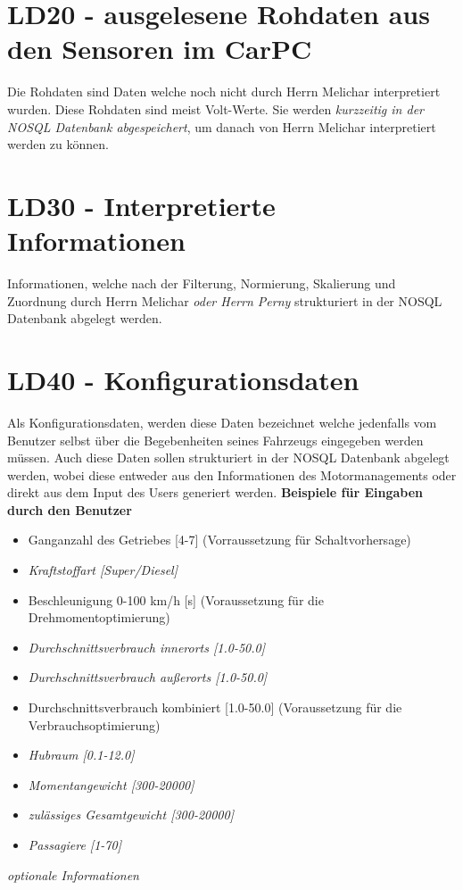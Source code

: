 \section{LD20 - ausgelesene Rohdaten aus den Sensoren im CarPC}
Die Rohdaten sind Daten welche noch nicht durch Herrn Melichar interpretiert wurden. Diese Rohdaten sind meist Volt-Werte. Sie werden \textit{kurzzeitig in der NOSQL Datenbank abgespeichert}, um danach von Herrn Melichar interpretiert werden zu können.

\section{LD30 - Interpretierte Informationen}
Informationen, welche nach der Filterung, Normierung, Skalierung und Zuordnung durch Herrn Melichar \textit{oder Herrn Perny} strukturiert in der NOSQL Datenbank abgelegt werden.

\section{LD40 - Konfigurationsdaten}
Als Konfigurationsdaten, werden diese Daten bezeichnet welche jedenfalls vom Benutzer selbst über die Begebenheiten seines Fahrzeugs eingegeben werden müssen. Auch diese Daten sollen strukturiert in der NOSQL Datenbank abgelegt werden, wobei diese entweder aus den Informationen des Motormanagements oder direkt aus dem Input des Users generiert werden.
\textbf{Beispiele für Eingaben durch den Benutzer}
\begin{itemize}
	\item Ganganzahl des Getriebes [4-7] (Vorraussetzung für Schaltvorhersage)
	\item \textit{Kraftstoffart [Super/Diesel]}
	\item Beschleunigung 0-100 km/h [s] (Voraussetzung für die Drehmomentoptimierung)
	\item \textit{Durchschnittsverbrauch innerorts [1.0-50.0]} 
	\item \textit{Durchschnittsverbrauch außerorts [1.0-50.0]}	
	\item Durchschnittsverbrauch kombiniert [1.0-50.0] (Voraussetzung für die Verbrauchsoptimierung)
	\item \textit{Hubraum [0.1-12.0]}
	\item \textit{Momentangewicht [300-20000]}
	\item \textit{zulässiges Gesamtgewicht [300-20000]}
	\item \textit{Passagiere [1-70]}
\end{itemize}
\textit{optionale Informationen}

